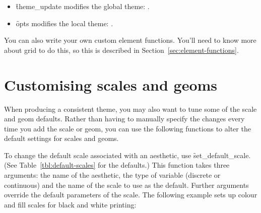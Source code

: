 \begin{itemize}
  \item \f{theme_update} modifies the global theme: .
  
  \item \f{opts} modifies the local theme: .
  
\end{itemize}

% 
% 

You can also write your own custom element functions.  You'll need to know more about grid to do this, so this is described in Section~\ref{sec:element-functions}.

\section{Customising scales and geoms}

When producing a consistent theme, you may also want to tune some of the scale and geom defaults.  Rather than having to manually specify the changes every time you add the scale or geom, you can use the following functions to alter the default settings for scales and geoms.

To change the default scale associated with an aesthetic, use \f{set_default_scale}. (See Table~\ref{tbl:default-scales} for the defaults.)  This function takes three arguments: the name of the aesthetic, the type of variable (discrete or continuous) and the name of the scale to use as the default.  Further arguments override the default parameters of the scale.  The following example sets up colour and fill scales for black and white printing:

% 


% 

